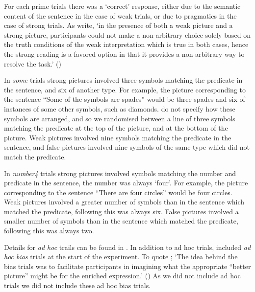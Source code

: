 \documentclass[10pt]{article}
\begin{document}
\begin{multicols}{2}
For each prime trials there was a `correct' response, either due to the semantic content of the sentence in the case of weak trials, or due to pragmatics in the case of strong trials.
As \citeauthor{Bott:2016aa} write, `in the presence of both a weak picture and a strong picture, participants could not make a non-arbitrary choice solely based on the truth conditions of the weak interpretation which is true in both cases, hence the strong reading is a favored option in that it provides a non-arbitrary way to resolve the task.'
(\citeyear[124]{Bott:2016aa})

In \emph{some} trials strong pictures involved three symbols matching the predicate in the sentence, and six of another type.
For example, the picture corresponding to the sentence ``Some of the symbols are spades'' would be three spades and six of instances of some other symbols, such as diamonds.
\citeauthor{Bott:2016aa} do not specify how these symbols are arranged, and so we randomised between a line of three symbols matching the predicate at the top of the picture, and at the bottom of the picture.
Weak pictures involved nine symbols matching the predicate in the sentence, and false pictures involved nine symbols of the same type which did not match the predicate.

In \emph{number4} trials strong pictures involved symbols matching the number and predicate in the sentence, the number was always `four'.
For example, the picture corresponding to the sentence ``There are four circles'' would be four circles.
Weak pictures involved a greater number of symbols than in the sentence which matched the predicate, following \citeauthor{Bott:2016aa} this was always six.
False pictures involved a smaller number of symbols than in the sentence which matched the predicate, following \citeauthor{Bott:2016aa} this was always two.

Details for \emph{ad hoc} trails can be found in \textcite[123--124]{Bott:2016aa}.
In addition to ad hoc trials, \citeauthor{Bott:2016aa} included \emph{ad hoc bias} trials at the start of the experiment.
To quote \citeauthor{Bott:2016aa}; `The idea behind the bias trials was to facilitate participants in imagining what the appropriate ``better picture'' might be for the enriched expression.' (\citeyear[124]{Bott:2016aa})
As we did not include ad hoc trials we did not include these ad hoc bias trials.


\end{multicols}
\end{document}
